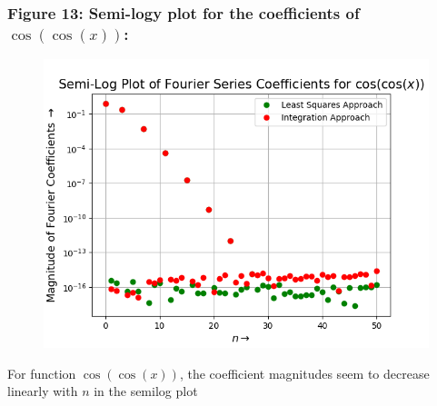 \documentclass[12pt, a4paper]{article}
\begin{document}
\subsubsection{Figure 13: Semi-logy plot for the coefficients of $\cos(\cos(x))$:}
\vspace*{-0.5cm}
\begin{figure}[H]
    \centering
    \includegraphics[scale = 0.75]{Figure_13.png}
    \label{fig:sample}
\end{figure}
\vspace*{-0.5cm}
\begin{center}
    For function $\cos(\cos(x))$, the coefficient magnitudes seem to decrease linearly with $n$ in the semilog plot
\end{center}
\end{document}
